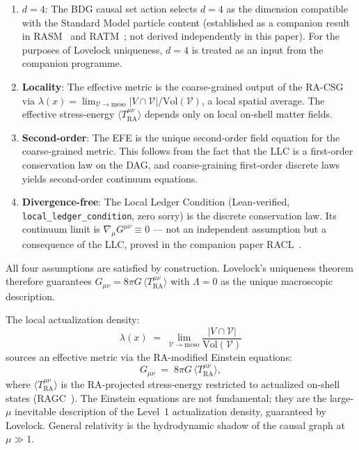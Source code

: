 \documentclass[11pt,a4paper]{article}
\theoremstyle{plain}
\theoremstyle{definition}
\theoremstyle{remark}
\newcommand{\Tact}{T^{\mu\nu}_{\mathrm{RA}}}
\begin{document}
\begin{enumerate}[noitemsep,label=(\roman*)]
  \item \textbf{$d=4$}: The BDG causal set action selects $d=4$ as the
  dimension compatible with the Standard Model particle content
  (established as a companion result in RASM~\citep{Sandeman2026RASM} and
  RATM~\citep{Sandeman2026RATM}; not derived independently in this paper).
  For the purposes of Lovelock uniqueness, $d=4$ is treated as an input
  from the companion programme.
  \item \textbf{Locality}: The effective metric is the coarse-grained output of
  the RA-CSG via $\lambda(x) = \lim_{\mathcal{V}\to\mathrm{meso}}|V \cap \mathcal{V}|/
  \mathrm{Vol}(\mathcal{V})$, a local spatial average. The effective stress-energy
  $\langle\Tact\rangle$ depends only on local on-shell matter fields.
  \item \textbf{Second-order}: The EFE is the unique second-order field equation
  for the coarse-grained metric. This follows from the fact that the LLC is a
  first-order conservation law on the DAG, and coarse-graining first-order
  discrete laws yields second-order continuum equations.
  \item \textbf{Divergence-free}: The Local Ledger Condition (Lean-verified,
  \texttt{local\_ledger\_condition}, zero sorry) is the discrete conservation
  law. Its continuum limit is $\nabla_\mu G^{\mu\nu} \equiv 0$ --- not an
  independent assumption but a consequence of the LLC, proved in the companion
  paper RACL~\citep{Sandeman2026RACL}.
\end{enumerate}

All four assumptions are satisfied by construction. Lovelock's uniqueness
theorem therefore guarantees $G_{\mu\nu} = 8\pi G\,\langle\Tact\rangle$
with $\Lambda = 0$ as the unique macroscopic description.



The local actualization density:
\begin{equation}
  \lambda(x) \;=\; \lim_{\mathcal{V} \to \mathrm{meso}}
  \frac{|V \cap \mathcal{V}|}{\mathrm{Vol}(\mathcal{V})}
  \label{eq:lambda_density_v2}
\end{equation}
sources an effective metric via the RA-modified Einstein equations:
\begin{equation}
  G_{\mu\nu} \;=\; 8\pi G\,\langle\Tact\rangle,
  \label{eq:ra_efe}
\end{equation}
where $\langle\Tact\rangle$ is the RA-projected stress-energy restricted to
actualized on-shell states (RAGC~\citep{Sandeman2026b}). The Einstein equations are not fundamental; they are the
large-$\mu$ inevitable description of the Level~1 actualization
density, guaranteed by Lovelock. General relativity is the
hydrodynamic shadow of the causal graph at $\mu \gg 1$.
\end{document}
